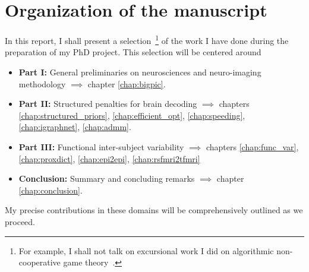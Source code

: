 \section{Organization of the manuscript}
In this report, I shall present a selection~\footnote{For example, I shall not talk on excursional work I did on algorithmic non-cooperative game theory~\citep{dohmatob2015simple}.} of the work I have done during the preparation of my PhD project.  This selection will be centered around
\begin{itemize}
\item \textbf{Part I:} General preliminaries on neurosciences and neuro-imaging methodology $\implies$ chapter \ref{chap:bigpic}.
\item \textbf{Part II:} Structured penalties for brain decoding $\implies$ chapters \ref{chap:structured_priors}, \ref{chap:efficient_opt}, \ref{chap:speeding}, \ref{chap:igraphnet}, \ref{chap:admm}.
\item \textbf{Part III:} Functional inter-subject variability $\implies$ chapters \ref{chap:func_var}, \ref{chap:proxdict}, \ref{chap:epi2epi}, \ref{chap:rsfmri2tfmri}
\item \textbf{Conclusion:} Summary and concluding remarks $\implies$ chapter \ref{chap:conclusion}.
\end{itemize}
My precise contributions in these domains will be comprehensively outlined  as we proceed.



